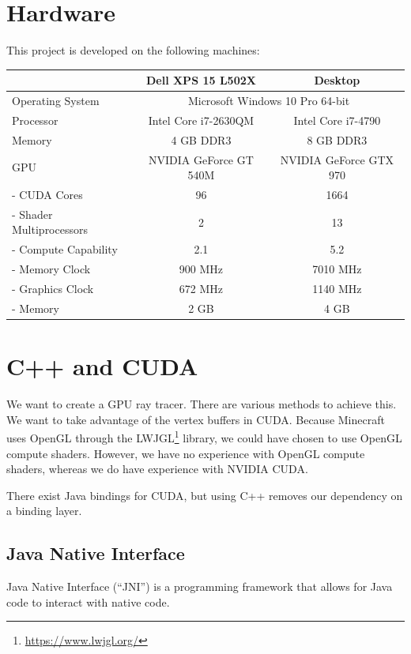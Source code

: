 \documentclass[]{article}
\begin{document}
\section{Hardware}
This project is developed on the following machines:

\begin{center}
  \begin{tabular}{| l || c | c |} \hline
    & Dell XPS 15 L502X & Desktop \\ \hline
    Operating System & \multicolumn{2}{c|}{Microsoft Windows 10 Pro 64-bit} \\ \hline
    Processor & Intel Core i7-2630QM & Intel Core i7-4790 \\ \hline
    Memory & 4 GB DDR3 & 8 GB DDR3 \\ \hline \hline
    GPU & NVIDIA GeForce GT 540M & NVIDIA GeForce GTX 970\\ \hline
    - CUDA Cores & 96 & 1664 \\ \hline
    - Shader Multiprocessors & 2 & 13 \\ \hline
    - Compute Capability & 2.1 & 5.2 \\ \hline
    - Memory Clock & 900 MHz & 7010 MHz \\ \hline
    - Graphics Clock & 672 MHz & 1140 MHz \\ \hline
    - Memory & 2 GB & 4 GB \\ \hline %
  \end{tabular}
\end{center}

\section{C++ and CUDA}
We want to create a GPU ray tracer.
There are various methods to achieve this. 
We want to take advantage of the vertex buffers in CUDA.
Because Minecraft uses OpenGL through the LWJGL\footnote{\url{https://www.lwjgl.org/}} library, we could have chosen to use OpenGL compute shaders.
However, we have no experience with OpenGL compute shaders, whereas we do have experience with NVIDIA CUDA.

There exist Java bindings for CUDA, but using C++ removes our dependency on a binding layer.
\subsection{Java Native Interface}
Java Native Interface (\enquote{JNI}) is a programming framework that allows for Java code to interact with native code.
\end{document}
